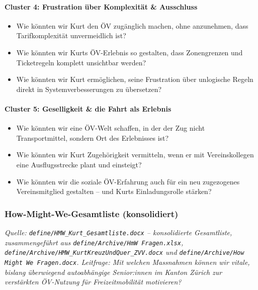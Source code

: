 \paragraph{Cluster 4: Frustration über Komplexität \& Ausschluss}
\begin{itemize}[nosep]
  \item Wie könnten wir Kurt den ÖV zugänglich machen, ohne anzunehmen, dass Tarifkomplexität unvermeidlich ist?
  \item Wie könnten wir Kurts ÖV-Erlebnis so gestalten, dass Zonengrenzen und Ticketregeln komplett unsichtbar werden?
  \item Wie könnten wir Kurt ermöglichen, seine Frustration über unlogische Regeln direkt in Systemverbesserungen zu übersetzen?
\end{itemize}

\paragraph{Cluster 5: Geselligkeit \& die Fahrt als Erlebnis}
\begin{itemize}[nosep]
  \item Wie könnten wir eine ÖV-Welt schaffen, in der der Zug nicht Transportmittel, sondern Ort des Erlebnisses ist?
  \item Wie könnten wir Kurt Zugehörigkeit vermitteln, wenn er mit Vereinskollegen eine Ausflugsstrecke plant und einsteigt?
  \item Wie könnten wir die soziale ÖV-Erfahrung auch für ein neu zugezogenes Vereinsmitglied gestalten -- und Kurts Einladungsrolle stärken?
\end{itemize}

\clearpage
\subsubsection{How-Might-We-Gesamtliste (konsolidiert)}
\label{anh:hmw}
\textit{Quelle: \texttt{define/HMW\_Kurt\_Gesamtliste.docx} -- konsolidierte Gesamtliste, zusammengeführt aus \texttt{define/Archive/HmW Fragen.xlsx}, \texttt{define/Archive/HMW\_KurtKreuzUndQuer\_ZVV.docx} und \texttt{define/Archive/How Might We Fragen.docx}. Leitfrage: Mit welchen Massnahmen können wir vitale, bislang überwiegend autoabhängige Senior:innen im Kanton Zürich zur verstärkten ÖV-Nutzung für Freizeitmobilität motivieren?}

